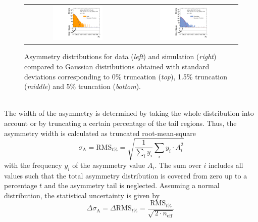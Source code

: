 \begin{figure}[!htp]
\begin{tabular}{cc}
                \includegraphics[width=0.49\textwidth]{figures/AsymmHistosDataWithRatio_Eta0_pt5_alpha2_final_nominal_95Truncation_v4c.pdf} &
                \includegraphics[width=0.49\textwidth]{figures/AsymmHistosSimWithRatio_Eta0_pt5_alpha2_final_nominal_95Truncation_v4c.pdf} \\
  \end{tabular}
  \caption{Asymmetry distributions for data (\textit{left}) and simulation (\textit{right}) compared to Gaussian distributions obtained with standard deviations corresponding to 0\% truncation (\textit{top}), 1.5\% truncation (\textit{middle}) and 5\% truncation (\textit{bottom}).}
  \label{fig:asymm_width}
\end{figure}
\\
The width of the asymmetry is determined by taking the whole distribution into account or by truncating a certain percentage of the tail regions. Thus, the asymmetry width is calculated as truncated root-mean-square
\begin{equation}
 \sigma_\mathrm{A} = \mathrm{RMS}_{t\%} = \sqrt{\frac{1}{\sum_{i} y_i} \sum_{i} y_i \cdot A_i^2}  
 \label{eq:truncated_rms}
\end{equation} 
with the frequency $y_i$ of the asymmetry value $A_i$. The sum over $i$ includes all values such that the total asymmetry distribution is covered from zero up to a percentage $t$ and the asymmetry tail is neglected. Assuming a normal distribution, the statistical uncertainty is given by
\begin{equation}
\Delta \sigma_\mathrm{A} = \Delta \mathrm{RMS}_{t\%} = \frac{\mathrm{RMS}_{t\%}}{\sqrt{\, 2 \cdot n_\mathrm{eff}}} \,
\end{equation} 
